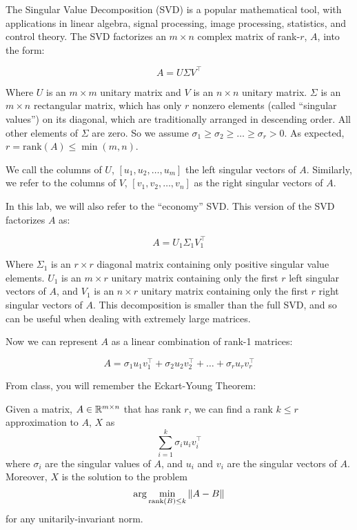 The Singular Value Decomposition (SVD) is a popular mathematical tool, with applications in linear algebra, signal processing, image processing, statistics, and control theory. The SVD factorizes an $m\times n$ complex matrix of rank-$r$, $A$, into the form:

\[ A = U \Sigma V^\intercal \]

Where $U$ is an $m\times m$ unitary matrix and $V$ is an $n \times n$ unitary matrix. $\Sigma$ is an $m \times n$ rectangular matrix, which has only $r$ nonzero elements (called ``singular values'') on its diagonal, which are traditionally arranged in descending order. All other elements of $\Sigma$ are zero. So we assume $\sigma_1 \geq \sigma_2 \geq \ldots \geq \sigma_r > 0$. As expected, $r = \mathrm{rank}(A) \leq \min(m,n)$.

We call the columns of $U$, $[u_1, u_2, \ldots, u_m]$ the left singular vectors of $A$. Similarly, we refer to the columns of $V$, $[v_1, v_2, \ldots, v_n]$ as the right singular vectors of $A$.

In this lab, we will also refer to the ``economy'' SVD. This version of the SVD factorizes $A$ as:

\[ A = U_1 \Sigma_1 V_1^\intercal \]

Where $\Sigma_1$ is an $r \times r$ diagonal matrix containing only positive singular value elements. $U_1$ is an $m \times r$ unitary matrix containing only the first $r$ left singular vectors of $A$, and $V_1$ is an $n \times r$ unitary matrix containing only the first $r$ right singular vectors of $A$. This decomposition is smaller than the full SVD, and so can be useful when dealing with extremely large matrices.

Now we can represent $A$ as a linear combination of rank-1 matrices:

\[ A = \sigma_1 u_1 v_1^\intercal + \sigma_2 u_2 v_2^\intercal + \ldots + \sigma_r u_r v_r^\intercal \]

From class, you will remember the Eckart-Young Theorem\cite{Eckart1936}:

\begin{theorem}
	Given a matrix, $A \in \mathbb{R}^{m \times n}$ that has rank $r$, we can find a rank $k \leq r$ approximation to $A$, $X$ as
	$$\sum_{i = 1}^k \sigma_i u_i v_i^\top$$
	where $\sigma_i$ are the singular values of $A$, and $u_i$ and $v_i$ are the singular vectors of $A$. Moreover, $X$ is  the solution to the problem
	$$\arg \min_{\mathrm{rank}\left(B\right) \leq k} \|A - B\|$$
	for any unitarily-invariant norm.
	\label{thm:eckart-young}
\end{theorem}

